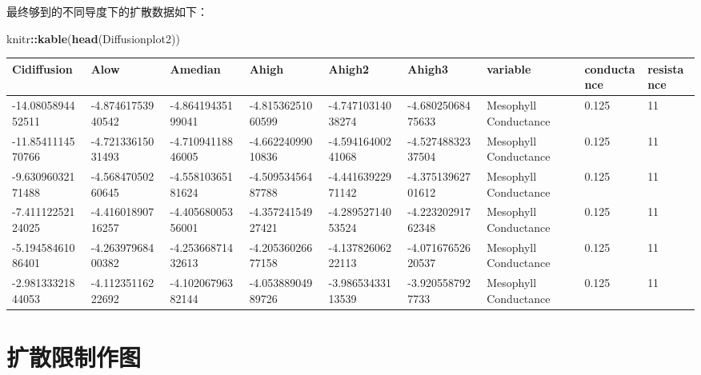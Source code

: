 \documentclass[
]{krantz}
\makeatletter
\newenvironment{Shaded}{\begin{snugshade}}{\end{snugshade}}
\newcommand{\KeywordTok}[1]{\textcolor[rgb]{0.13,0.29,0.53}{\textbf{#1}}}
\newcommand{\NormalTok}[1]{#1}
\newcommand{\OperatorTok}[1]{\textcolor[rgb]{0.81,0.36,0.00}{\textbf{#1}}}
\newenvironment{kframe}{%
\medskip{}
\setlength{\fboxsep}{.8em}
 \def\at@end@of@kframe{}%
 \ifinner\ifhmode%
  \def\at@end@of@kframe{\end{minipage}}%
  \begin{minipage}{\columnwidth}%
 \fi\fi%
 \def\FrameCommand##1{\hskip\@totalleftmargin \hskip-\fboxsep
 \colorbox{shadecolor}{##1}\hskip-\fboxsep
     \hskip-\linewidth \hskip-\@totalleftmargin \hskip\columnwidth}%
 \MakeFramed {\advance\hsize-\width
   \@totalleftmargin\z@ \linewidth\hsize
   \@setminipage}}%
 {\par\unskip\endMakeFramed%
 \at@end@of@kframe}
\renewenvironment{Shaded}{\begin{kframe}}{\end{kframe}}
\makeatother
\begin{document}
最终够到的不同导度下的扩散数据如下：

\begin{Shaded}
\begin{Highlighting}[]
\NormalTok{knitr}\OperatorTok{::}\KeywordTok{kable}\NormalTok{(}\KeywordTok{head}\NormalTok{(Diffusionplot2))}
\end{Highlighting}
\end{Shaded}

\begin{tabular}{l|l|l|l|l|l|l|l|l}
\hline
Cidiffusion & Alow & Amedian & Ahigh & Ahigh2 & Ahigh3 & variable & conductance & resistance\\
\hline
-14.0805894452511 & -4.87461753940542 & -4.86419435199041 & -4.81536251060599 & -4.74710314038274 & -4.68025068475633 & Mesophyll Conductance & 0.125 & 11\\
\hline
-11.8541114570766 & -4.72133615031493 & -4.71094118846005 & -4.66224099010836 & -4.59416400241068 & -4.52748832337504 & Mesophyll Conductance & 0.125 & 11\\
\hline
-9.63096032171488 & -4.56847050260645 & -4.55810365181624 & -4.50953456487788 & -4.44163922971142 & -4.37513962701612 & Mesophyll Conductance & 0.125 & 11\\
\hline
-7.41112252124025 & -4.41601890716257 & -4.40568005356001 & -4.35724154927421 & -4.28952714053524 & -4.22320291762348 & Mesophyll Conductance & 0.125 & 11\\
\hline
-5.19458461086401 & -4.26397968400382 & -4.25366871432613 & -4.20536026677158 & -4.13782606222113 & -4.07167652620537 & Mesophyll Conductance & 0.125 & 11\\
\hline
-2.98133321844053 & -4.11235116222692 & -4.10206796382144 & -4.05388904989726 & -3.98653433113539 & -3.9205587927733 & Mesophyll Conductance & 0.125 & 11\\
\hline
\end{tabular}

\hypertarget{multi13}{%
\section{扩散限制作图}\label{multi13}}
\end{document}

